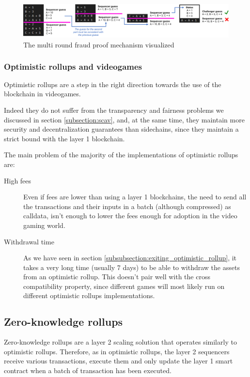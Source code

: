 \documentclass[12pt]{article}
\begin{document}
\begin{figure}[h]
    \centering
    \includegraphics[width=\textwidth]{multi_round_fraud_proof}
    \caption{The multi round fraud proof mechanism visualized}
    \label{figure:multi_round_fraud_proof}
\end{figure}

\subsubsection{Optimistic rollups and videogames} \label{subsubsection:orav}
Optimistic rollups are a step in the right direction towards the use of the blockchain in videogames.

Indeed they do not suffer from the transparency and fairness problems we discussed in section \ref{subsection:scav}, and, at the same time, they maintain more security and decentralization guarantees than sidechains, since they maintain a strict bound with the layer 1 blockchain.

The main problem of the majority of the implementations of optimistic rollups are:
\begin{description}
    \item[High fees] Even if fees are lower than using a layer 1 blockchains, the need to send all the transactions and their inputs in a batch (although compressed) as calldata, isn't enough to lower the fees enough for adoption in the video gaming world.
    \item[Withdrawal time] As we have seen in section \ref{subsubsection:exiting_optimistic_rollup}, it takes a very long time (usually 7 days) to be able to withdraw the assets from an optimistic rollup. This doesn't pair well with the cross compatibility property, since different games will most likely run on different optimistic rollups implementations.
\end{description}

\subsection{Zero-knowledge rollups} \label{subsection:zk_rollups}
Zero-knowledge rollups are a layer 2 scaling solution that operates similarly to optimistic rollups. Therefore, as in optimistic rollups, the layer 2 sequencers receive various transactions, execute them and only update the layer 1 smart contract when a batch of transaction has been executed.
\end{document}
